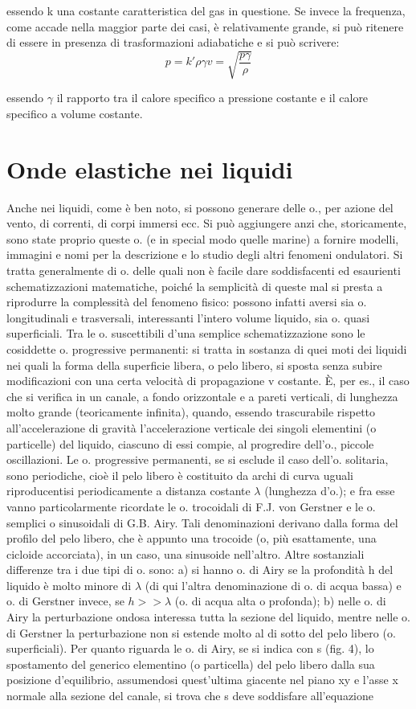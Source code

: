 \documentclass[a4paper]{article}
\begin{document}
essendo k una costante caratteristica del gas in questione. Se invece la frequenza, come accade nella maggior parte dei casi, è relativamente grande, si può ritenere di essere in presenza di trasformazioni adiabatiche e si può scrivere: 
\begin{equation}
p=k'\rho \gamma
v=\sqrt{\frac{p\gamma}{\rho}}
\end{equation}

essendo $\gamma$ il rapporto tra il calore specifico a pressione costante e il calore specifico a volume costante.

\section{Onde elastiche nei liquidi}
Anche nei liquidi, come è ben noto, si possono generare delle o., per azione del vento, di correnti, di corpi immersi ecc. Si può aggiungere anzi che, storicamente, sono state proprio queste o. (e in special modo quelle marine) a fornire modelli, immagini e nomi per la descrizione e lo studio degli altri fenomeni ondulatori. Si tratta generalmente di o. delle quali non è facile dare soddisfacenti ed esaurienti schematizzazioni matematiche, poiché la semplicità di queste mal si presta a riprodurre la complessità del fenomeno fisico: possono infatti aversi sia o. longitudinali e trasversali, interessanti l'intero volume liquido, sia o. quasi superficiali. Tra le o. suscettibili d'una semplice schematizzazione sono le cosiddette o. progressive permanenti: si tratta in sostanza di quei moti dei liquidi nei quali la forma della superficie libera, o pelo libero, si sposta senza subire modificazioni con una certa velocità di propagazione v costante. È, per es., il caso che si verifica in un canale, a fondo orizzontale e a pareti verticali, di lunghezza molto grande (teoricamente infinita), quando, essendo trascurabile rispetto all'accelerazione di gravità l'accelerazione verticale dei singoli elementini (o particelle) del liquido, ciascuno di essi compie, al progredire dell'o., piccole oscillazioni. Le o. progressive permanenti, se si esclude il caso dell'o. solitaria, sono periodiche, cioè il pelo libero è costituito da archi di curva uguali riproducentisi periodicamente a distanza costante $\lambda$ (lunghezza d'o.); e fra esse vanno particolarmente ricordate le o. trocoidali di F.J. von Gerstner e le o. semplici o sinusoidali di G.B. Airy. Tali denominazioni derivano dalla forma del profilo del pelo libero, che è appunto una trocoide (o, più esattamente, una cicloide accorciata), in un caso, una sinusoide nell'altro. Altre sostanziali differenze tra i due tipi di o. sono: a) si hanno o. di Airy se la profondità h del liquido è molto minore di $\lambda$ (di qui l'altra denominazione di o. di acqua bassa) e o. di Gerstner invece, se $h>>\lambda$ (o. di acqua alta o profonda); b) nelle o. di Airy la perturbazione ondosa interessa tutta la sezione del liquido, mentre nelle o. di Gerstner la perturbazione non si estende molto al di sotto del pelo libero (o. superficiali). Per quanto riguarda le o. di Airy, se si indica con s (fig. 4), lo spostamento del generico elementino (o particella) del pelo libero dalla sua posizione d'equilibrio, assumendosi quest'ultima giacente nel piano xy e l'asse x normale alla sezione del canale, si trova che s deve soddisfare all'equazione
\end{document}
